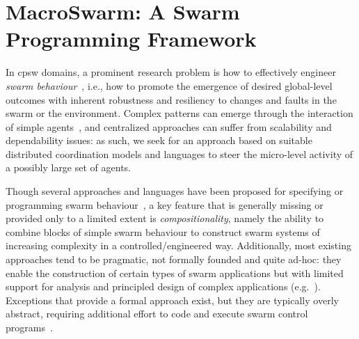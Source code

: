 %
\newcommand{\MacroSwarm}{{\sc{}MacroSwarm}}

\chapter[\MacroSwarm{}]{\MacroSwarm{}: A Swarm Programming Framework}\label{chap:eng:macroswarm}%
\minitoc%
%
In \ac{cpsw} domains,
 a prominent research problem
 is how to effectively engineer \emph{swarm behaviour}~\cite{DBLP:journals/swarm/BrambillaFBD13},
 i.e., how to promote 
 the emergence of desired global-level outcomes %
 with inherent robustness and resiliency to changes and faults in the swarm or the environment.
%
Complex patterns can emerge through the interaction of simple agents~\cite{bonabeau1999swarmintelligence-book}, and centralized approaches %
 can suffer from scalability and dependability issues: as such,  
 we seek for an approach based on %
 suitable distributed coordination models and languages to steer the micro-level activity of a possibly large set of agents.
%
 
%
Though several approaches and languages have been proposed 
 for specifying or programming swarm behaviour~\cite{Meld2007,%
DBLP:conf/icra/CarrollNS21,%
paros,%
DBLP:conf/isola/KosakHBWHR20,%
Koutsoubelias2016tecola,%
lima2018dolphin,%
Mottola2014voltron,%
DBLP:conf/iros/PinciroliB16,%
DBLP:conf/iros/YiDLD0WY20},
 a key feature that is generally missing or provided only to a limited extent
 is \emph{compositionality},
 namely the ability to combine blocks of simple swarm behaviour to construct swarm systems of increasing complexity in a controlled/engineered way.
%
Additionally, most existing approaches tend to be pragmatic, not formally founded and quite ad-hoc: 
 they enable the construction of certain types of swarm applications
 but with limited support for analysis and principled design of complex applications 
 (e.g.~\cite{lima2018dolphin,paros,DBLP:conf/iros/PinciroliB16,DBLP:conf/icra/CarrollNS21}).
%
Exceptions that provide a formal approach exist, 
 but they are typically overly abstract, 
 requiring additional effort to code and execute swarm control programs~\cite{DBLP:journals/csur/LuckcuckFDDF19}.

